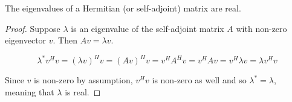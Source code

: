 \documentclass[12pt]{article}
\begin{document}
The eigenvalues of a Hermitian (or self-adjoint) matrix are real.

\begin{proof}
Suppose $\lambda$ is an eigenvalue of the self-adjoint matrix $A$ with 
non-zero eigenvector $v$. Then $Av = \lambda v$.

\[
\lambda ^{\ast }v^{H}v=\left( \lambda v\right) ^{H}v=\left( Av\right)
^{H}v=v^{H}A^{H}v=v^{H}Av=v^{H}\lambda v=\lambda v^{H}v
\]

Since $v$ is non-zero by assumption, $v^H v$ is non-zero as well and so $\lambda^{*}=\lambda$, meaning that $\lambda$ is real.
\end{proof}
\end{document}
